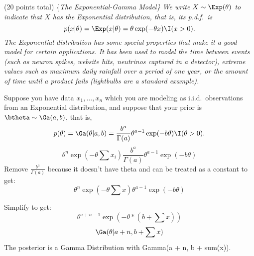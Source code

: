 \documentclass[
]{article}
\begin{document}
\item

(20 points total) \{\em The Exponential-Gamma Model\} We write
\(X\sim\Exp(\theta)\) to indicate that \(X\) has the Exponential
distribution, that is, its p.d.f.~is
\[ p(x|\theta) =\Exp(x|\theta) = \theta\exp(-\theta x)\I(x>0). \] The
Exponential distribution has some special properties that make it a good
model for certain applications. It has been used to model the time
between events (such as neuron spikes, website hits, neutrinos captured
in a detector), extreme values such as maximum daily rainfall over a
period of one year, or the amount of time until a product fails
(lightbulbs are a standard example).

Suppose you have data \(x_1,\dotsc,x_n\) which you are modeling as
i.i.d.~observations from an Exponential distribution, and suppose that
your prior is \(\btheta\sim\Ga(a,b)\), that is,
\[ p(\theta) = \Ga(\theta|a,b) = \frac{b^a}{\Gamma(a)}\theta^{a-1}\exp(-b\theta) \I(\theta>0).\]
\[\theta^{n}\exp(-\theta \sum{x_i})\frac{b^a}{\Gamma(a)}\theta^{a-1}\exp(-b\theta)\]
Remove \(\frac{b^a}{\Gamma(a)}\) because it doesn't have theta and can
be treated as a constant to get:
\[\theta^{n}\exp(-\theta \sum{x})\theta^{a-1}\exp(-b\theta)\]

Simplify to get: \[\theta^{a + n -1}\exp(-\theta *(b + \sum{x}))\]
\[\Ga(\theta|a+n,b + \sum{x})\] The posterior is a Gamma Distribution
with Gamma(a + n, b + sum(x)).
\end{document}
